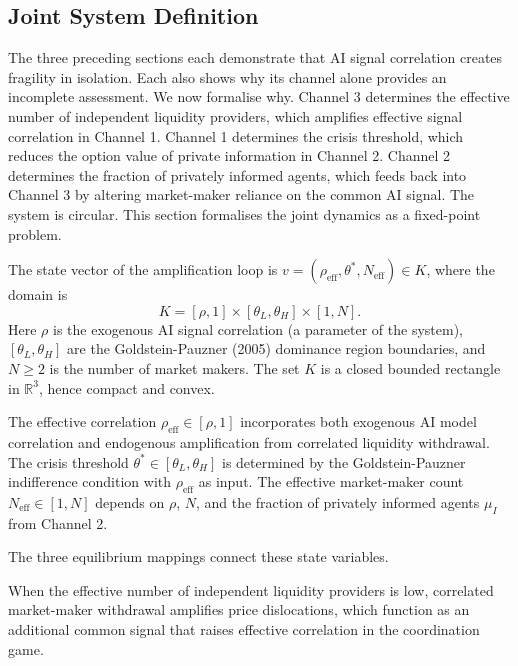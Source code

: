 \label{sec:amplification}

\subsection{Joint System Definition}

The three preceding sections each demonstrate that AI signal correlation creates fragility in isolation. Each also shows why its channel alone provides an incomplete assessment. We now formalise why. Channel 3 determines the effective number of independent liquidity providers, which amplifies effective signal correlation in Channel 1. Channel 1 determines the crisis threshold, which reduces the option value of private information in Channel 2. Channel 2 determines the fraction of privately informed agents, which feeds back into Channel 3 by altering market-maker reliance on the common AI signal. The system is circular. This section formalises the joint dynamics as a fixed-point problem.

The state vector of the amplification loop is $v = (\rho_{\text{eff}}, \theta^*, N_{\text{eff}}) \in K$, where the domain is
\begin{equation}\label{eq:domain}
  K = [\rho, 1] \times [\theta_L, \theta_H] \times [1, N].
\end{equation}
Here $\rho$ is the exogenous AI signal correlation (a parameter of the system), $[\theta_L, \theta_H]$ are the Goldstein-Pauzner (2005) dominance region boundaries, and $N \geq 2$ is the number of market makers. The set $K$ is a closed bounded rectangle in $\mathbb{R}^3$, hence compact and convex.

The effective correlation $\rho_{\text{eff}} \in [\rho, 1]$ incorporates both exogenous AI model correlation and endogenous amplification from correlated liquidity withdrawal. The crisis threshold $\theta^* \in [\theta_L, \theta_H]$ is determined by the Goldstein-Pauzner indifference condition with $\rho_{\text{eff}}$ as input. The effective market-maker count $N_{\text{eff}} \in [1, N]$ depends on $\rho$, $N$, and the fraction of privately informed agents $\mu_I$ from Channel 2.

The three equilibrium mappings connect these state variables.

 When the effective number of independent liquidity providers is low, correlated market-maker withdrawal amplifies price dislocations, which function as an additional common signal that raises effective correlation in the coordination game.

